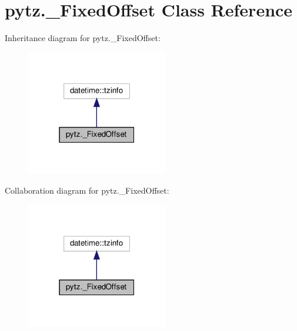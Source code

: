 \hypertarget{classpytz_1_1__FixedOffset}{}\section{pytz.\+\_\+\+Fixed\+Offset Class Reference}
\label{classpytz_1_1__FixedOffset}


Inheritance diagram for pytz.\+\_\+\+Fixed\+Offset\+:
\nopagebreak
\begin{figure}[H]
\begin{center}
\leavevmode
\includegraphics[width=175pt]{classpytz_1_1__FixedOffset__inherit__graph}
\end{center}
\end{figure}


Collaboration diagram for pytz.\+\_\+\+Fixed\+Offset\+:
\nopagebreak
\begin{figure}[H]
\begin{center}
\leavevmode
\includegraphics[width=175pt]{classpytz_1_1__FixedOffset__coll__graph}
\end{center}
\end{figure}
